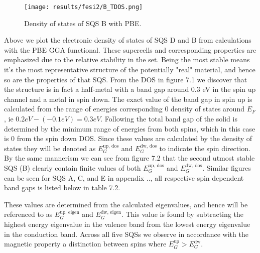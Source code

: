 \begin{figure}[H]
\centering
	\texttt{[image: results/fesi2/B\_TDOS.png]}
	\caption{Density of states of SQS B  with PBE.}
\end{figure}  

Above we plot the electronic density of states of SQS D and B from calculations with the PBE GGA functional. These supercells and corresponding properties are emphasized due to the relative stability in the set. Being the most stable means it's the most representative structure of the potentially "real" material, and hence so are the properties of that SQS. From the DOS in figure 7.1 we discover that the structure is in fact a half-metal with a band gap around 0.3 eV in the spin up channel and a metal in spin down. The exact value of the band gap in spin up is calculated from the range of energies corresponding 0 density of states around $E_F$, ie $ 0.2 eV - (-0.1 eV) = 0.3 eV$. Following the total band gap of the solid is determined by the minimum range of energies from both spins, which in this case is 0 from the spin down DOS. Since these values are calculated by the density of states they will be denoted as $E_G ^\text{up, dos}$ and $E_G ^\text{dw, dos}$ to indicate the spin direction. By the same mannerism we can see from figure 7.2 that the second utmost stable SQS (B) clearly contain finite values of both $E_G ^\text{up, dos}$ and $E_G ^\text{dw, dos}$. Similar figures can be seen for SQS A, C, and E in appendix ..,  all respective spin dependent band gaps is listed below in table 7.2. 

These values are determined from the calculated eigenvalues, and hence will be referenced to as $E_G ^\text{up, eigen}$ and $E_G ^\text{dw, eigen}$. This value is found by subtracting the highest energy eigenvalue in the valence band from the lowest energy eigenvalue in the conduction band. Across all five SQSs we observe in accordance with the magnetic property a distinction between spins where $E_G ^\text{up} > E_G ^\text{dw}$.
 
